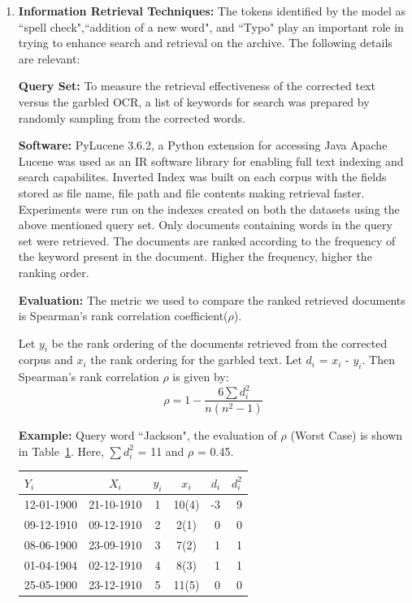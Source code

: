 \documentclass[letterpaper]{article}
\begin{document}
\begin{enumerate}
\item \textbf{Information Retrieval Techniques: } The tokens identified by the model as ``spell check",``addition of a new word", and ``Typo" play an important role in trying to enhance search and retrieval on the archive. The following details are relevant: 

\textbf{Query Set:} To measure the retrieval effectiveness of the corrected text versus the garbled OCR, a list of keywords for search was prepared by randomly sampling from the corrected words.

\textbf{Software:} PyLucene 3.6.2, a Python extension for accessing Java Apache Lucene was used as an IR software library for enabling full text indexing and search capabilites. Inverted Index was built on each corpus with the fields stored as file name, file path and file contents making retrieval faster. Experiments were run on the indexes created on both the datasets using the above mentioned query set. Only documents containing words in the query set were retrieved. The documents are ranked according to the frequency of the keyword present in the document. Higher the frequency, higher the ranking order.
 
 \textbf{Evaluation:} The metric we used to compare the ranked retrieved documents is Spearman's rank correlation coefficient($\rho$). 
 
Let $y_{i}$ be the rank ordering of the documents retrieved from the corrected corpus and $x_{i}$ the rank ordering for the garbled text. Let $d_{i}$ = $x_{i}$ - $y_{i}$. Then Spearman's rank correlation $\rho$ is given by:
\begin{equation}
\rho = 1 - \frac {6\sum d_i^2 }{n(n^2-1)} 
\end{equation}

\textbf{Example: } Query word ``Jackson", the evaluation of $\rho$ (Worst Case) is shown in Table~\ref{ex}. Here, ${\sum d_i^2}$ = 11 and $\rho$ = 0.45.
\begin{table}[h]
\centering
\begin{tabular}{ l | c | c | c | r | r }
 $Y_{i}$ & $X_{i}$ & $y_{i}$ & $x_{i}$ & $d_{i}$ & $d_{i}^2$ \\
\hline
  12-01-1900 & 21-10-1910 & 1 & 10(4) & -3 & 9 \\
  09-12-1910 & 09-12-1910 & 2 & 2(1) & 0 & 0 \\
  08-06-1900 & 23-09-1910 & 3 & 7(2) & 1 & 1 \\
  01-04-1904 & 02-12-1910 & 4 & 8(3) & 1 & 1 \\
  25-05-1900 & 23-12-1910 & 5 & 11(5) & 0 & 0 \\
\end{tabular}
\label{ex}
\end{table}


\end{enumerate}
\end{document}
